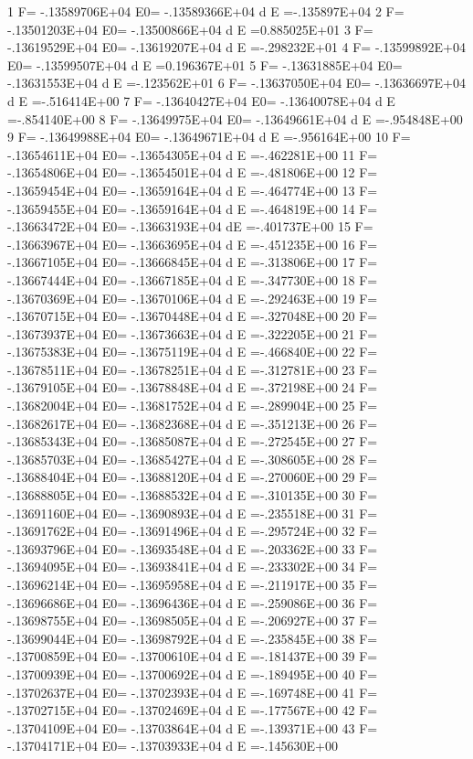    1 F= -.13589706E+04 E0= -.13589366E+04  d E =-.135897E+04
   2 F= -.13501203E+04 E0= -.13500866E+04  d E =0.885025E+01
   3 F= -.13619529E+04 E0= -.13619207E+04  d E =-.298232E+01
   4 F= -.13599892E+04 E0= -.13599507E+04  d E =0.196367E+01
   5 F= -.13631885E+04 E0= -.13631553E+04  d E =-.123562E+01
   6 F= -.13637050E+04 E0= -.13636697E+04  d E =-.516414E+00
   7 F= -.13640427E+04 E0= -.13640078E+04  d E =-.854140E+00
   8 F= -.13649975E+04 E0= -.13649661E+04  d E =-.954848E+00
   9 F= -.13649988E+04 E0= -.13649671E+04  d E =-.956164E+00
  10 F= -.13654611E+04 E0= -.13654305E+04  d E =-.462281E+00
  11 F= -.13654806E+04 E0= -.13654501E+04  d E =-.481806E+00
  12 F= -.13659454E+04 E0= -.13659164E+04  d E =-.464774E+00
  13 F= -.13659455E+04 E0= -.13659164E+04  d E =-.464819E+00
  14 F= -.13663472E+04 E0= -.13663193E+04  dE =-.401737E+00
  15 F= -.13663967E+04 E0= -.13663695E+04  d E =-.451235E+00
  16 F= -.13667105E+04 E0= -.13666845E+04  d E =-.313806E+00
  17 F= -.13667444E+04 E0= -.13667185E+04  d E =-.347730E+00
  18 F= -.13670369E+04 E0= -.13670106E+04  d E =-.292463E+00
  19 F= -.13670715E+04 E0= -.13670448E+04  d E =-.327048E+00
  20 F= -.13673937E+04 E0= -.13673663E+04  d E =-.322205E+00
  21 F= -.13675383E+04 E0= -.13675119E+04  d E =-.466840E+00
  22 F= -.13678511E+04 E0= -.13678251E+04  d E =-.312781E+00
  23 F= -.13679105E+04 E0= -.13678848E+04  d E =-.372198E+00
  24 F= -.13682004E+04 E0= -.13681752E+04  d E =-.289904E+00
  25 F= -.13682617E+04 E0= -.13682368E+04  d E =-.351213E+00
  26 F= -.13685343E+04 E0= -.13685087E+04  d E =-.272545E+00
  27 F= -.13685703E+04 E0= -.13685427E+04  d E =-.308605E+00
  28 F= -.13688404E+04 E0= -.13688120E+04  d E =-.270060E+00
  29 F= -.13688805E+04 E0= -.13688532E+04  d E =-.310135E+00
  30 F= -.13691160E+04 E0= -.13690893E+04  d E =-.235518E+00
  31 F= -.13691762E+04 E0= -.13691496E+04  d E =-.295724E+00
  32 F= -.13693796E+04 E0= -.13693548E+04  d E =-.203362E+00
  33 F= -.13694095E+04 E0= -.13693841E+04  d E =-.233302E+00
  34 F= -.13696214E+04 E0= -.13695958E+04  d E =-.211917E+00
  35 F= -.13696686E+04 E0= -.13696436E+04  d E =-.259086E+00
  36 F= -.13698755E+04 E0= -.13698505E+04  d E =-.206927E+00
  37 F= -.13699044E+04 E0= -.13698792E+04  d E =-.235845E+00
  38 F= -.13700859E+04 E0= -.13700610E+04  d E =-.181437E+00
  39 F= -.13700939E+04 E0= -.13700692E+04  d E =-.189495E+00
  40 F= -.13702637E+04 E0= -.13702393E+04  d E =-.169748E+00
  41 F= -.13702715E+04 E0= -.13702469E+04  d E =-.177567E+00
  42 F= -.13704109E+04 E0= -.13703864E+04  d E =-.139371E+00
  43 F= -.13704171E+04 E0= -.13703933E+04  d E =-.145630E+00
